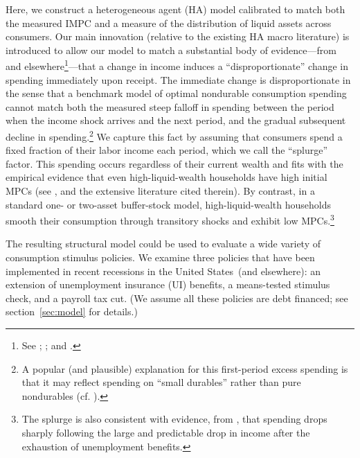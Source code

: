 \documentclass[\econtexRoot/HAFiscal]{subfiles}
\begin{document}
Here, we construct a heterogeneous agent (HA) model calibrated to match both the measured IMPC and a measure of the distribution of liquid assets across consumers.  Our main innovation (relative to the existing HA macro literature) is introduced to allow our model to match a substantial body of evidence---from \cite{fagereng_mpc_2021} and elsewhere\footnote{See \cite{parker2013consumer}; \cite{ganongConsumer2019}; and \cite{olafsson2018liquid}.}---that a change in income induces a ``disproportionate'' change in spending immediately upon receipt.  The immediate change is disproportionate in the sense that a benchmark model of optimal nondurable consumption spending cannot match both the measured steep falloff in spending between the period when the income shock arrives and the next period, and the gradual subsequent decline in spending.\footnote{A popular (and plausible) explanation for this first-period excess spending is that it may reflect spending on ``small durables'' rather than pure nondurables (cf. \cite{laibson2022simple}).}  We capture this fact by assuming that consumers spend a fixed fraction of their labor income each period, which we call the ``splurge'' factor. This spending occurs regardless of their current wealth and fits with the empirical evidence that even high-liquid-wealth households have high initial MPCs (see \cite{crawleyMicroMacro}, and the extensive literature cited therein).  By contrast, in a standard one- or two-asset buffer-stock model, high-liquid-wealth households smooth their consumption through transitory shocks and exhibit low MPCs.\footnote{The splurge is also consistent with evidence, from \cite{ganongConsumer2019}, that spending drops sharply following the large and predictable drop in income after the exhaustion of unemployment benefits.}

The resulting structural model could be used to evaluate a wide variety of consumption stimulus policies.  We examine three policies that have been implemented in recent recessions in the United States\ (and elsewhere): an extension of unemployment insurance (UI) benefits, a means-tested stimulus check, and a payroll tax cut.  (We assume all these policies are debt financed; see section~\ref{sec:model} for details.)  %
\end{document}
